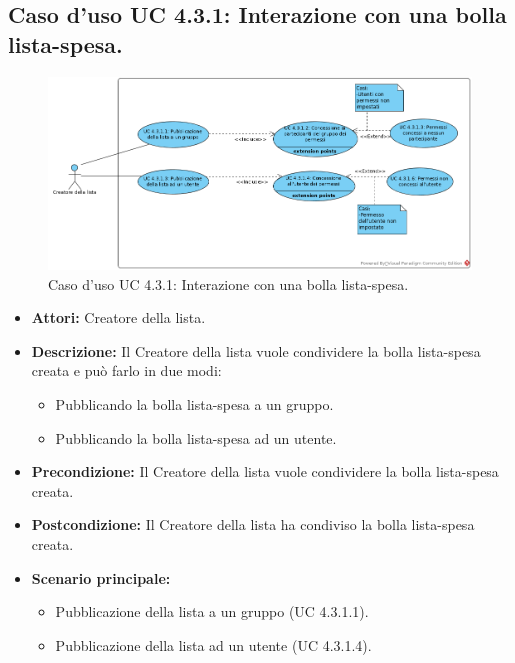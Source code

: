 \subsection{Caso d'uso UC 4.3.1: Interazione con una bolla lista-spesa.}
\label{Caso d'uso UC 4.3.1: Interazione con una bolla lista-spesa.}
\begin{figure}[ht]
	\centering
	\includegraphics[scale=0.60]{Usecases/img/UC4.3.1.png}
	\caption{Caso d'uso UC 4.3.1: Interazione con una bolla lista-spesa.}
\end{figure}

\FloatBarrier
\begin{itemize}
\item \textbf{Attori:} Creatore della lista.
\item \textbf{Descrizione:} Il Creatore della lista vuole condividere la bolla lista-spesa creata e può farlo in due modi:
\begin{itemize}
\item Pubblicando la bolla lista-spesa a un gruppo.
\item Pubblicando la bolla lista-spesa ad un utente.
\end{itemize}
\item \textbf{Precondizione:} Il Creatore della lista vuole condividere la bolla lista-spesa creata. 
\item \textbf{Postcondizione:} Il Creatore della lista ha condiviso la bolla lista-spesa creata.
\item \textbf{Scenario principale:}
	\begin{itemize}
	\item{Pubblicazione della lista a un gruppo (UC 4.3.1.1).}
	\item{Pubblicazione della lista ad un utente (UC 4.3.1.4).}
	\end{itemize}
\end{itemize}